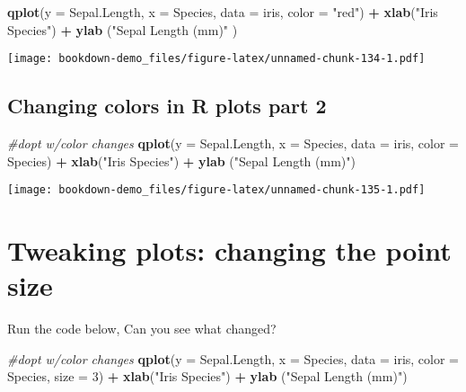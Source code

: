 \documentclass[]{book}
\newenvironment{Shaded}{\begin{snugshade}}{\end{snugshade}}
\newcommand{\KeywordTok}[1]{\textcolor[rgb]{0.13,0.29,0.53}{\textbf{#1}}}
\newcommand{\DataTypeTok}[1]{\textcolor[rgb]{0.13,0.29,0.53}{#1}}
\newcommand{\DecValTok}[1]{\textcolor[rgb]{0.00,0.00,0.81}{#1}}
\newcommand{\StringTok}[1]{\textcolor[rgb]{0.31,0.60,0.02}{#1}}
\newcommand{\CommentTok}[1]{\textcolor[rgb]{0.56,0.35,0.01}{\textit{#1}}}
\newcommand{\OperatorTok}[1]{\textcolor[rgb]{0.81,0.36,0.00}{\textbf{#1}}}
\newcommand{\NormalTok}[1]{#1}
\theoremstyle{definition}
\theoremstyle{definition}
\theoremstyle{definition}
\theoremstyle{remark}
\begin{document}
\begin{Shaded}
\begin{Highlighting}[]
\KeywordTok{qplot}\NormalTok{(}\DataTypeTok{y =}\NormalTok{ Sepal.Length,}
      \DataTypeTok{x =}\NormalTok{ Species,    }
        \DataTypeTok{data =}\NormalTok{ iris,}
      \DataTypeTok{color =} \StringTok{"red"}\NormalTok{) }\OperatorTok{+}
\StringTok{  }\KeywordTok{xlab}\NormalTok{(}\StringTok{"Iris Species"}\NormalTok{) }\OperatorTok{+}\StringTok{  }
\StringTok{  }\KeywordTok{ylab}\NormalTok{ (}\StringTok{"Sepal Length (mm)"}\NormalTok{ )}
\end{Highlighting}
\end{Shaded}

\texttt{[image: bookdown-demo\_files/figure-latex/unnamed-chunk-134-1.pdf]}

\subsection{Changing colors in R plots part
2}\label{changing-colors-in-r-plots-part-2}

\begin{Shaded}
\begin{Highlighting}[]
\CommentTok{#dopt w/color changes}
\KeywordTok{qplot}\NormalTok{(}\DataTypeTok{y =}\NormalTok{ Sepal.Length,}
      \DataTypeTok{x =}\NormalTok{ Species,    }
        \DataTypeTok{data =}\NormalTok{ iris,}
      \DataTypeTok{color =}\NormalTok{ Species) }\OperatorTok{+}
\StringTok{  }\KeywordTok{xlab}\NormalTok{(}\StringTok{"Iris Species"}\NormalTok{) }\OperatorTok{+}\StringTok{  }
\StringTok{  }\KeywordTok{ylab}\NormalTok{ (}\StringTok{"Sepal Length (mm)"}\NormalTok{)}
\end{Highlighting}
\end{Shaded}

\texttt{[image: bookdown-demo\_files/figure-latex/unnamed-chunk-135-1.pdf]}

\section{Tweaking plots: changing the point
size}\label{tweaking-plots-changing-the-point-size}

Run the code below, Can you see what changed?

\begin{Shaded}
\begin{Highlighting}[]
\CommentTok{#dopt w/color changes}
\KeywordTok{qplot}\NormalTok{(}\DataTypeTok{y =}\NormalTok{ Sepal.Length,}
      \DataTypeTok{x =}\NormalTok{ Species,    }
        \DataTypeTok{data =}\NormalTok{ iris,}
      \DataTypeTok{color =}\NormalTok{ Species,}
      \DataTypeTok{size =} \DecValTok{3}\NormalTok{) }\OperatorTok{+}
\StringTok{  }\KeywordTok{xlab}\NormalTok{(}\StringTok{"Iris Species"}\NormalTok{) }\OperatorTok{+}\StringTok{  }
\StringTok{  }\KeywordTok{ylab}\NormalTok{ (}\StringTok{"Sepal Length (mm)"}\NormalTok{)}
\end{Highlighting}
\end{Shaded}
\end{document}
